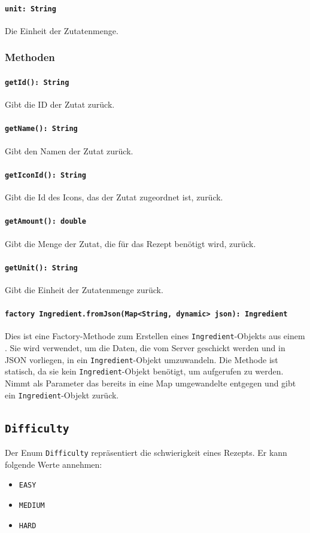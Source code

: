 \documentclass{entwurfsheft}
\begin{document}
\paragraph{\texttt{unit: String}}
Die Einheit der Zutatenmenge.

\subsubsection*{Methoden}
\paragraph{\texttt{getId(): String}}
Gibt die ID der Zutat zurück.
\paragraph{\texttt{getName(): String}}
Gibt den Namen der Zutat zurück.
\paragraph{\texttt{getIconId(): String}}
Gibt die Id des Icons, das der Zutat zugeordnet ist, zurück.
\paragraph{\texttt{getAmount(): double}}
Gibt die Menge der Zutat, die für das Rezept benötigt wird, zurück.
\paragraph{\texttt{getUnit(): String}}
Gibt die Einheit der Zutatenmenge zurück.
\paragraph{\texttt{factory Ingredient.fromJson(Map<String, dynamic> json): Ingredient}}
Dies ist eine Factory-Methode zum Erstellen eines \texttt{Ingredient}-Objekts aus einem . Sie wird verwendet, um die Daten, die vom Server geschickt werden und in \Gls{JSON} vorliegen, in ein \texttt{Ingredient}-Objekt umzuwandeln. Die Methode ist statisch, da sie kein \texttt{Ingredient}-Objekt benötigt, um aufgerufen zu werden. Nimmt als Parameter das bereits in eine Map umgewandelte  entgegen und gibt ein \texttt{Ingredient}-Objekt zurück.

\newpage
\subsection{\texttt{Difficulty}}\label{sec:difficulty}
Der Enum \texttt{Difficulty} repräsentiert die \Gls{schwierigkeit} eines Rezepts. Er kann folgende Werte annehmen:
\begin{itemize}
    \item \texttt{EASY}
    \item \texttt{MEDIUM}
    \item \texttt{HARD}
\end{itemize}
\newpage
\end{document}

